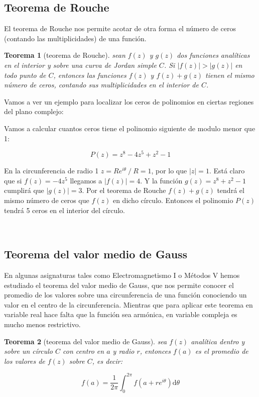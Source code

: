 \documentclass[12pt]{book}
\newcommand{\D}{\mathrm{d}}
\newtheorem{theorem}{Teorema}[section]
\begin{document}
\subsection{Teorema de Rouche}

El teorema de Rouche nos permite acotar de otra forma el número de ceros (contando las multiplicidades) de una función. 

\begin{theorem}[teorema de Rouche]
sean $f(z)$ y $g(z)$ dos funciones analíticas en el interior y sobre una curva de Jordan simple $C$. Si $|f(z)|>|g(z)|$ en todo punto de $C$, entonces las funciones $f(z)$ y $f(z)+g(z)$ tienen el mismo número de ceros, contando sus multiplicidades en el interior de $C$.
\end{theorem}

Vamos a ver un ejemplo para localizar los ceros de polinomios en ciertas regiones del plano complejo:\\


\hrulefill

Vamos a calcular cuantos ceros tiene el polinomio siguiente de modulo menor que 1:

$$ P(z) = z^8 - 4z^5 + z^2 - 1 $$

En la circunferencia de radio 1 $z=Re^{i\theta} \ / \ R=1$, por lo que $|z|=1$. Está claro que si $f(z) = - 4 z^5$ llegamos a $|f(z)| = 4$. Y la función $g(z) = z^8 + z^2 -1$ cumplirá que $|g(z)|=3$. Por el teorema de Rouche $f(z)+g(z)$ tendrá el mismo número de ceros que $f(z)$ en dicho círculo. Entonces el polinomio $P(z)$ tendrá 5 ceros en el interior del círculo. 


\hrulefill \\



\subsection{Teorema del valor medio de Gauss}

En algunas asignaturas tales como Electromagnetismo I o Métodos V hemos estudiado el teorema del valor medio de Gauss, que nos permite conocer el promedio de los valores sobre una circunferencia de una función conociendo un valor en el centro de la circunferencia. Mientras que para aplicar este teorema en variable real hace falta que la función sea armónica, en variable compleja es mucho menos restrictivo.

\begin{theorem}[teorema del valor medio de Gauss]
sea $f(z)$ analítica dentro y sobre un círculo $C$ con centro en $a$ y radio $r$, entonces $f(a)$ es el promedio de los valores de $f(z)$ sobre $C$, es decir:

$$ f(a) = \frac{1}{2 \pi} \int_0^{2\pi} f(a+re^{i \theta}) \D  \theta $$
\end{theorem}
\end{document}
